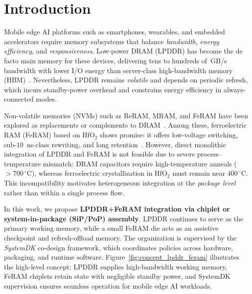 \section{Introduction}

Mobile edge AI platforms such as smartphones, wearables, and embedded accelerators require memory subsystems that balance
\emph{bandwidth}, \emph{energy efficiency}, and \emph{responsiveness}.
Low-power DRAM (LPDDR) has become the de facto main memory for these devices, delivering tens to hundreds of~GB/s bandwidth
with lower I/O energy than server-class high-bandwidth memory (HBM)~\cite{ChoiIEDM2022}.
Nevertheless, LPDDR remains \emph{volatile} and depends on periodic refresh, which incurs standby-power overhead
and constrains energy efficiency in always-connected modes.

Non-volatile memories (NVMs) such as ReRAM, MRAM, and FeRAM have been explored as replacements or complements to DRAM~\cite{NohedaNRM2023,WongProcIEEE2012,IkedaNature2010,WeebitIEDM2022}.
Among these, ferroelectric RAM (FeRAM) based on HfO$_2$ shows promise: it offers low-voltage switching, sub-$10$~ns-class rewriting, and long retention~\cite{MullerAPL2011,KimIEDM2021}.
However, direct monolithic integration of LPDDR and FeRAM is not feasible due to severe process--temperature mismatch:
DRAM capacitors require high-temperature anneals ($>700\,^\circ\mathrm{C}$), whereas ferroelectric crystallization in HfO$_2$ must remain near $400\,^\circ\mathrm{C}$.
This incompatibility motivates heterogeneous integration at the \emph{package level} rather than within a single process flow.

In this work, we propose \textbf{LPDDR+FeRAM integration via chiplet or system-in-package (SiP/PoP) assembly}.
LPDDR continues to serve as the primary working memory, while a small FeRAM die acts as an assistive checkpoint and refresh-offload memory.
The organization is supervised by the \emph{SystemDK} co-design framework, which coordinates policies across hardware, packaging, and runtime software.
Figure~\ref{fig:concept_lpddr_feram} illustrates the high-level concept:
LPDDR supplies high-bandwidth working memory, FeRAM chiplets retain state with negligible standby power,
and SystemDK supervision ensures seamless operation for mobile edge AI workloads.


